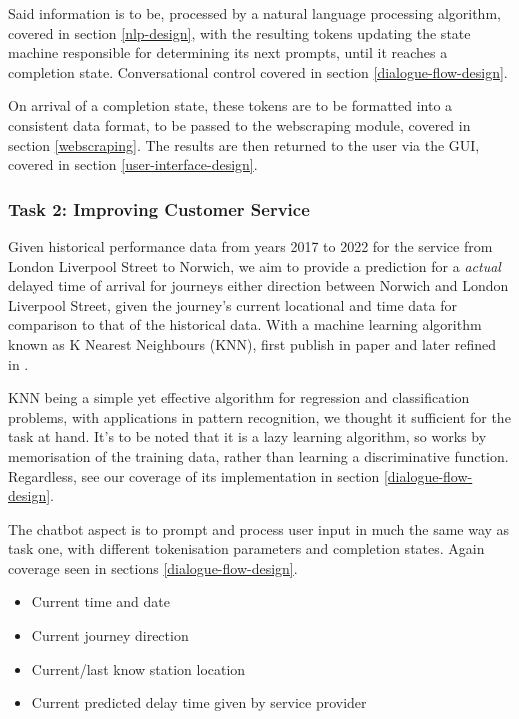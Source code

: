 \documentclass[11pt]{article}
\newcounter{subsubsubsection}[subsubsection]
\begin{document}
Said information is to be, processed by a natural language processing algorithm, covered in section \ref{nlp-design}, with the resulting tokens updating the state machine responsible for determining its next prompts, until it reaches a completion state. Conversational control covered in section \ref{dialogue-flow-design}.

On arrival of a completion state, these tokens are to be formatted into a consistent data format, to be passed to the webscraping module, covered in section \ref{webscraping}. The results are then returned to the user via the GUI, covered in section \ref{user-interface-design}.

\subsubsection{Task 2: Improving Customer Service} \label{task2-aims-objectives}

Given historical performance data from years 2017 to 2022 for the service from London Liverpool Street to Norwich, we aim to provide a prediction for a \textit{actual} delayed time of arrival for journeys either direction between Norwich and London Liverpool Street, given the journey's current locational and time data for comparison to that of the historical data. With a machine learning algorithm known as K Nearest Neighbours (KNN), first publish in paper \cite{knn-origin} and later refined in \cite{knn-refine}.

KNN being a simple yet effective algorithm for regression and classification problems, with applications in pattern recognition, we thought it sufficient for the task at hand. It's to be noted that it is a lazy learning algorithm, so works by memorisation of the training data, rather than learning a discriminative function. Regardless, see our coverage of its implementation in section \ref{dialogue-flow-design}.

The chatbot aspect is to prompt and process user input in much the same way as task one, with different tokenisation parameters and completion states. Again coverage seen in sections \ref{dialogue-flow-design}.

\begin{itemize}
    \item Current time and date
    \item Current journey direction
    \item Current/last know station location
    \item Current predicted delay time given by service provider
\end{itemize}
\end{document}
